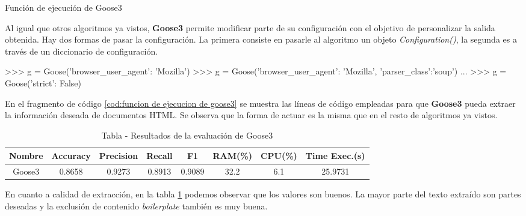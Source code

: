 \begin{codefloat}
    
    \caption{Función de ejecución de Goose3}
    \label{cod:funcion de ejecucion de goose3}
\end{codefloat}

Al igual que otros algoritmos ya vistos, \textbf{Goose3} permite modificar parte de su configuración con el
objetivo de personalizar la salida obtenida. Hay dos formas de pasar la configuración. La primera consiste
en pasarle al algoritmo un objeto \emph{Configuration()}, la segunda es a través de un diccionario de 
configuración.

\begin{Schunk}
    \begin{Soutput}
    >>> g = Goose({'browser_user_agent': 'Mozilla'})
    >>> g = Goose({'browser_user_agent': 'Mozilla', 'parser_class':'soup'})
    ...
    >>> g = Goose({'strict': False})
    \end{Soutput}
\end{Schunk}

En el fragmento de código \ref{cod:funcion de ejecucion de goose3} se muestra las líneas de código empleadas
para que \textbf{Goose3} pueda extraer la información deseada de documentos HTML. Se observa que la forma
de actuar es la misma que en el resto de algoritmos ya vistos. 

\begin{table}[h]
    \begin{center}
      \begin{tabular}{| c | c | c | c | c | c | c | c |} \hline 
       \textbf{Nombre} & \textbf{Accuracy} & \textbf{Precision}  & \textbf{Recall} & \textbf{F1} & \textbf{RAM(\%)} & \textbf{CPU(\%)} & \textbf{Time Exec.(s)} \\ \hline
       Goose3 & 0.8658 & 0.9273 & 0.8913 & 0.9089 & 32.2 & 6.1 & 25.9731 \\ \hline
      \end{tabular}
      \caption{Tabla - Resultados de la evaluación de Goose3}
      \label{tab:tabla - resultados de la evaluacion de goose3}
    \end{center}
\end{table}

En cuanto a calidad de extracción, en la tabla \ref{tab:tabla - resultados de la evaluacion de goose3}
podemos observar que los valores son buenos. La mayor parte del texto extraído son partes deseadas y la 
exclusión de contenido \emph{boilerplate} también es muy buena.

